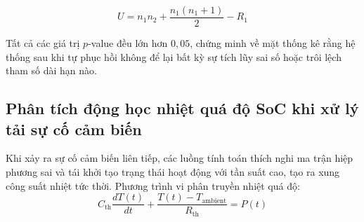 \begin{equation}
U = n_1 n_2 + \frac{n_1(n_1 + 1)}{2} - R_1
\label{eq:mann-whitney-u-formula}
\end{equation}

\begin{table}[H]
\centering
\caption{Kết quả kiểm định thống kê phi tham số về tính đồng nhất phân phối sai số}
\label{tab:nonparametric-tests-results}
\end{table}

Tất cả các giá trị $p$-value đều lớn hơn $0{,}05$, chứng minh về mặt thống kê rằng hệ thống sau khi tự phục hồi không để lại bất kỳ sự tích lũy sai số hoặc trôi lệch tham số dài hạn nào.

\subsection{Phân tích động học nhiệt quá độ SoC khi xử lý tải sự cố cảm biến}

\hspace{0.5cm} Khi xảy ra sự cố cảm biến liên tiếp, các luồng tính toán thích nghi ma trận hiệp phương sai và tái khởi tạo trạng thái hoạt động với tần suất cao, tạo ra xung công suất nhiệt tức thời. Phương trình vi phân truyền nhiệt quá độ:
\begin{equation}
C_{\text{th}} \frac{dT(t)}{dt} + \frac{T(t) - T_{\text{ambient}}}{R_{\text{th}}} = P(t)
\label{eq:thermal-transient-differential-equation}
\end{equation}

